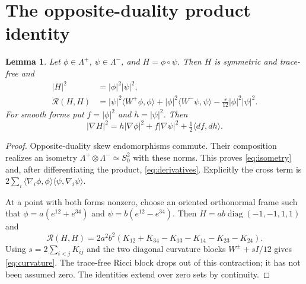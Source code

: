 \documentclass[11pt,a4paper]{article}
\newtheorem{lemma}[theorem]{Lemma}
\theoremstyle{remark}\newtheorem{remark}[theorem]{Remark}
\newcommand{\ip}[2]{\langle #1,#2\rangle}
\numberwithin{equation}{section}
\begin{document}
\section{The opposite-duality product identity}

\begin{lemma}\label{lem:algebra}
Let $\phi\in\Lambda^+$, $\psi\in\Lambda^-$, and $H=\phi\circ\psi$.
Then $H$ is symmetric and trace-free and
\begin{align}
 |H|^2&=|\phi|^2|\psi|^2,\label{eq:isometry}\\
 \mathscr R(H,H)&=
 |\psi|^2\ip{W^+\phi}{\phi}
 +|\phi|^2\ip{W^-\psi}{\psi}
 -\frac{s}{12}|\phi|^2|\psi|^2.\label{eq:curvature}
\end{align}
For smooth forms put $f=|\phi|^2$ and $h=|\psi|^2$. Then
\begin{equation}\label{eq:derivatives}
 |\nabla H|^2=h|\nabla\phi|^2+f|\nabla\psi|^2
                  +\tfrac12\ip{df}{dh}.
\end{equation}
\end{lemma}
\begin{proof}
Opposite-duality skew endomorphisms commute. Their composition realizes
an isometry $\Lambda^+\otimes\Lambda^-\simeq S^2_0$ with these norms.
This proves \eqref{eq:isometry} and, after differentiating the product,
\eqref{eq:derivatives}. Explicitly the cross term is
$2\sum_i\ip{\nabla_i\phi}{\phi}\ip{\psi}{\nabla_i\psi}$.

At a point with both forms nonzero, choose an oriented orthonormal frame
such that $\phi=a(e^{12}+e^{34})$ and
$\psi=b(e^{12}-e^{34})$. Then
$H=ab\operatorname{diag}(-1,-1,1,1)$ and
\[
 \mathscr R(H,H)
 =2a^2b^2(K_{12}+K_{34}-K_{13}-K_{14}-K_{23}-K_{24}).
\]
Using $s=2\sum_{i<j}K_{ij}$ and the two diagonal curvature blocks
$W^\pm+sI/12$ gives \eqref{eq:curvature}. The trace-free Ricci block
drops out of this contraction; it has not been assumed zero.
The identities extend over zero sets by continuity.
\end{proof}
\end{document}
